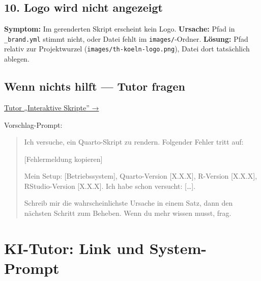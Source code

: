 \documentclass[
  ngerman,
  a4paper,
  DIV=11]{scrreprt}
\begin{document}
\section{10. Logo wird nicht angezeigt}\label{logo-wird-nicht-angezeigt}

\textbf{Symptom:} Im gerenderten Skript erscheint kein Logo.
\textbf{Ursache:} Pfad in \texttt{\_brand.yml} stimmt nicht, oder Datei
fehlt im \texttt{images/}-Ordner. \textbf{Lösung:} Pfad relativ zur
Projektwurzel (\texttt{images/th-koeln-logo.png}), Datei dort
tatsächlich ablegen.

\section{Wenn nichts hilft --- Tutor
fragen}\label{wenn-nichts-hilft-tutor-fragen}

\begin{tcolorbox}[enhanced jigsaw, opacitybacktitle=0.6, leftrule=.75mm, title=\textcolor{quarto-callout-tip-color}{\faLightbulb}\hspace{0.5em}{Tutor öffnen}, colframe=quarto-callout-tip-color-frame, arc=.35mm, toprule=.15mm, colbacktitle=quarto-callout-tip-color!10!white, bottomrule=.15mm, colback=white, rightrule=.15mm, breakable, toptitle=1mm, bottomtitle=1mm, opacityback=0, titlerule=0mm, coltitle=black, left=2mm]

\href{https://chatgpt.com/g/g-69fec93348108191af1ffb8ce0cf6712-tutor-interaktive-skripte}{Tutor
„Interaktive Skripte'' →}

Vorschlag-Prompt:

\begin{quote}
Ich versuche, ein Quarto-Skript zu rendern. Folgender Fehler tritt auf:

{[}Fehlermeldung kopieren{]}

Mein Setup: {[}Betriebssystem{]}, Quarto-Version {[}X.X.X{]}, R-Version
{[}X.X.X{]}, RStudio-Version {[}X.X.X{]}. Ich habe schon versucht:
{[}\ldots{]}.

Schreib mir die wahrscheinlichste Ursache in einem Satz, dann den
nächsten Schritt zum Beheben. Wenn du mehr wissen musst, frag.
\end{quote}

\end{tcolorbox}

\chapter{KI-Tutor: Link und
System-Prompt}\label{ki-tutor-link-und-system-prompt}
\end{document}
